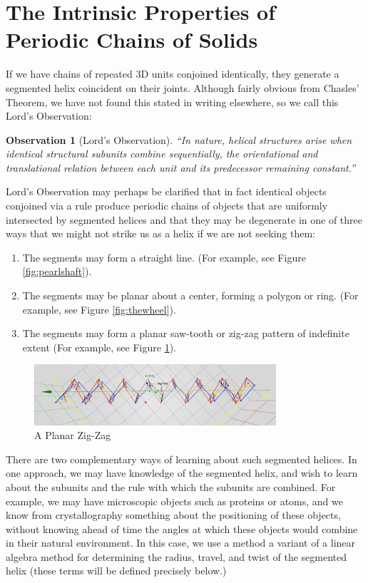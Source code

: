 \documentclass[11pt]{article}
\newtheorem{observation}{Observation}
\begin{document}
{\section{The Intrinsic Properties of Periodic Chains of Solids}

If we have chains of repeated 3D units conjoined identically, they generate a segmented helix coincident on their joints.
Although fairly obvious from Chasles' Theorem, we have not found this stated in writing elsewhere, so we call this Lord's Observation:

\begin{observation}[Lord's Observation]
  “In nature, helical structures arise when identical structural subunits combine sequentially, the orientational and translational relation between each unit and its predecessor remaining constant.”\cite{lord2002helical}
\end{observation}
Lord's Observation may perhaps be clarified that in fact identical objects conjoined via a rule
produce periodic chains of objects that are uniformly intersected by segmented helices and that they may be degenerate in one of
three ways that we might not strike us as a helix if we are not seeking them:
\begin{enumerate}
\item The segments may form a straight line. (For example, see Figure \ref{fig:pearlshaft}).
\item The segments may be planar about a center, forming a polygon or ring. (For example, see Figure \ref{fig:thewheel}).
\item The segments may form a planar saw-tooth or zig-zag pattern of indefinite extent (For example, see Figure \ref{fig:planarzigzag}).
\end{enumerate}

\begin{figure}
     \centering
     \includegraphics[width=0.80\textwidth]{figures/PlanarZigZag.png}
     \caption{A Planar Zig-Zag}
  \label{fig:planarzigzag}
\end{figure}

There are two complementary ways of learning about such segmented helices.
In one approach, we may have knowledge of the segmented helix, and
wish to learn about the subunits and the rule with which the subunits are combined.
For example, we may have microscopic objects such as proteins
or atoms, and we know from crystallography something about the positioning of these objects, without
knowing ahead of time the angles at which these objects would combine in their natural environment.
In this case, we use a method a variant of a linear algebra method\cite{kahn1989defining} for determining the radius, travel, and twist
of the segmented helix (these terms will be defined precisely below.)

}
\end{document}
